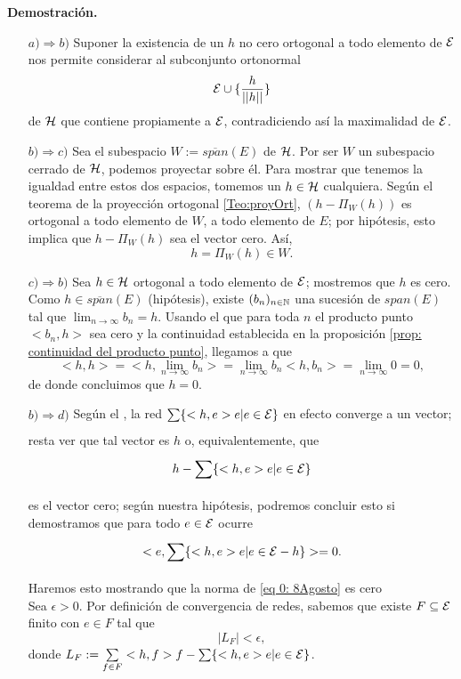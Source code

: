 \noindent
\textbf{Demostración.}
\begin{itemize}
\item[$a) \Rightarrow b)$] Suponer la existencia de un 
$h$ no cero ortogonal a todo elemento de $\mathcal{E}$
nos permite considerar al subconjunto ortonormal
\[
\mathcal{E} \cup \{ \frac{h}{||h||} \}
\]
de $\mathcal{H}$
que contiene propiamente a $\mathcal{E}$,
contradiciendo así la maximalidad de $\mathcal{E}$.

\item[$b) \Rightarrow c)$] Sea el subespacio
$W := \overline{span}(E)$ de $\mathcal{H}$. Por ser
$W$ un subespacio cerrado de $\mathcal{H}$, podemos proyectar
sobre él. Para mostrar que tenemos la igualdad entre
estos dos espacios, tomemos un $h \in \mathcal{H}$ cualquiera.
Según el teorema de la proyección ortogonal 
\ref{Teo:proyOrt}, $(h-\Pi_{W}(h))$
es ortogonal a todo elemento de $W$, 
a todo elemento de $E$;
por hipótesis, esto implica que $h-\Pi_{W}(h)$ sea el vector cero.
Así,
\[
h = \Pi_{W}(h) \in W.
\]

\item[$c) \Rightarrow b)$] Sea $h \in \mathcal{H}$
ortogonal a todo elemento de $\mathcal{E}$; mostremos que
$h$ es cero. Como $h \in \overline{span}(E)$ (hipótesis),
existe $(b_{n})_{n \in \mathbb{N}}$ una sucesión de
$span(E)$ tal que
$\lim_{n \rightarrow \infty}b_{n}=h$.
Usando el que para toda $n$ el producto punto $<b_{n}, h>$
sea cero y la continuidad
establecida en la proposición \ref{prop: continuidad del producto punto},
llegamos a que
\[
<h,h>= <h, \lim_{n \rightarrow \infty}b_{n}>= 
\lim_{n \rightarrow \infty}b_{n}<h, b_{n}>= 
\lim_{n \rightarrow \infty} 0 = 0,
\]
de donde concluimos que $h=0$.


\item[$b) \Rightarrow d)$] Según el ,
la red $\sum\limits_{}^{}\{ <h,e>e | e \in \mathcal{E} \}$
en efecto converge a un vector; resta ver que tal 
vector es $h$
o, equivalentemente, que
\begin{equation} \label{eq 0: 8Agosto}
h- \sum\limits_{}^{}\{ <h,e>e | e \in \mathcal{E} \}
\end{equation}
es el vector cero; según nuestra hipótesis, podremos
concluir esto si demostramos que para todo $e \in \mathcal{E}$
ocurre
\[
<e, \sum\limits_{}^{}\{ <h,e>e | e \in \mathcal{E} -h \} > =0.
\]
Haremos esto mostrando que la norma de 
\eqref{eq 0: 8Agosto} es cero \\
Sea $\epsilon >0$.
Por definición de convergencia de redes, sabemos que
existe $F \subseteq \mathcal{E}$ finito con $e \in F$
tal que
\begin{equation} \label{eq 1: 8Agosto}
|L_{F}| < \epsilon,
\end{equation}
donde $L_{F}:= \sum\limits_{f \in F}^{}<h,f>f - 
\sum\limits_{}^{}\{ <h,e>e| e \in \mathcal{E} \}$. \\


\end{itemize}

